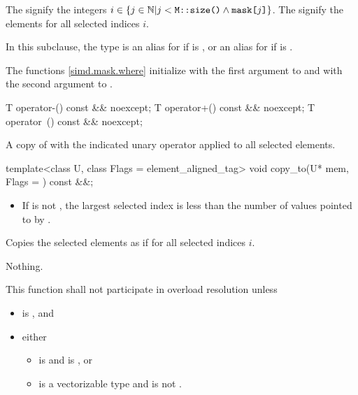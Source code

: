 \pnum
The  signify the integers $i \in \{j \in \mathbb{N} | j < \texttt{M::size()} \wedge \texttt{mask[}j\texttt{]}\}$. The  signify the elements  for all selected indices $i$.

\pnum
In this subclause, the type  is an alias for  if  is , or an alias for  if  is .

\pnum
\begin{note}
  The  functions \ref{simd.mask.where} initialize  with the first argument to  and  with the second argument to .
\end{note}

\begin{itemdecl}
T operator-() const && noexcept;
T operator+() const && noexcept;
T operator~() const && noexcept;
\end{itemdecl}

\begin{itemdescr}
  \pnum\returns
  A copy of  with the indicated unary operator applied to all selected elements.
\end{itemdescr}

\begin{itemdecl}
template<class U, class Flags = element_aligned_tag> void copy_to(U* mem, Flags = {}) const &&;
\end{itemdecl}

\begin{itemdescr}
  \pnum\requires
  \begin{itemize}
    \item If  is not , the largest selected index is less than the number of values pointed to by .
  \end{itemize}

  \pnum\effects
  Copies the selected elements as if  for all selected indices $i$.

  \pnum\throws Nothing.

  \pnum\remarks
  This function shall not participate in overload resolution unless
  \begin{itemize}
    \item {} is , and
    \item either
      \begin{itemize}
        \item {} is  and  is , or
        \item {} is a vectorizable type and  is not .
      \end{itemize}
  \end{itemize}
\end{itemdescr}

